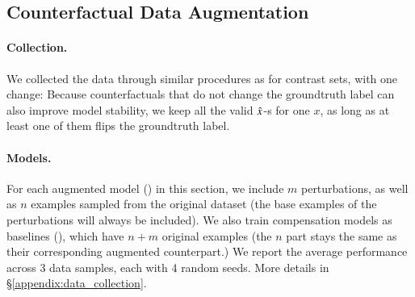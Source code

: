 \TableAugSST
\TableAugNLI

\subsection{Counterfactual Data Augmentation}
\label{subsec:augmentation}
\paragraph{Collection.}
We collected the data through similar procedures as for contrast sets, with one change:
Because counterfactuals that do not change the groundtruth label can also improve model stability, we keep all the valid $\hat{x}$-s for one $x$, as long as at least one of them flips the groundtruth label.

\paragraph{Models.}

For each augmented model (\maug) in this section, we include $m$ perturbations, as well as $n$ examples sampled from the original dataset (the base examples of the perturbations will always be included).
We also train compensation models as baselines (\mcomp), which have $n+m$ original examples (the $n$ part stays the same as their corresponding augmented counterpart.)
We report the average performance across 3 data samples, each with 4 random seeds. More details in \S\ref{appendix:data_collection}.

